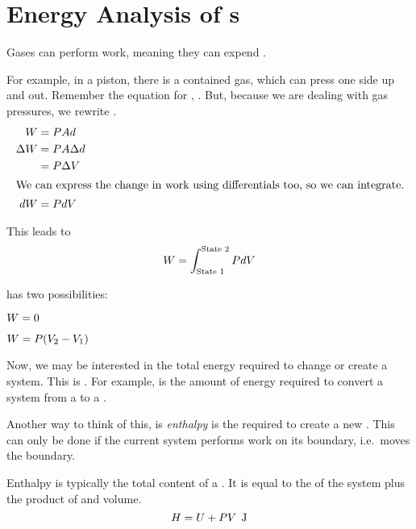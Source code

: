 \section{Energy Analysis of s}\label{def:Energy_Analysis_Closed_Systems}
Gases can perform work, meaning they can expend .

For example, in a piston, there is a contained gas, which can press one side up and out.
Remember the equation for , .
But, because we are dealing with gas pressures, we rewrite .
\begin{align*}
  W &= P A d \\
  \Delta W &= P A \Delta d \\
        &= P \Delta V \\
  \intertext{We can express the change in work using differentials too, so we can integrate.}
  d W &= P dV
\end{align*}

This leads to 
\begin{equation}\label{eq:Moving_Boundary_Work}
W = \int_{\text{State 1}}^{\text{State 2}} P dV
\end{equation}

 has two possibilities:

\begin{description}[noitemsep]
\item[Volume is Constant] $W = 0$
\item[Pressure is Constant] $W = P (V_{2} - V_{1})$
\end{description}

Now, we may be interested in the total energy required to change or create a system.
This is .
For example,  is the amount of energy required to convert a system from a  to a .

\begin{definition}[Enthalpy]\label{def:Enthalpy}
  Another way to think of this, is \emph{enthalpy} is the  required to create a new .
  This can only be done if the current system performs work on its boundary, i.e.\ moves the boundary.

  Enthalpy is typically the total  content of a .
  It is equal to the  of the system plus the product of  and volume.
  \begin{equation}\label{eq:Enthalpy}
    H = U + P V \:\: \si{\joule}
  \end{equation}
\end{definition}

